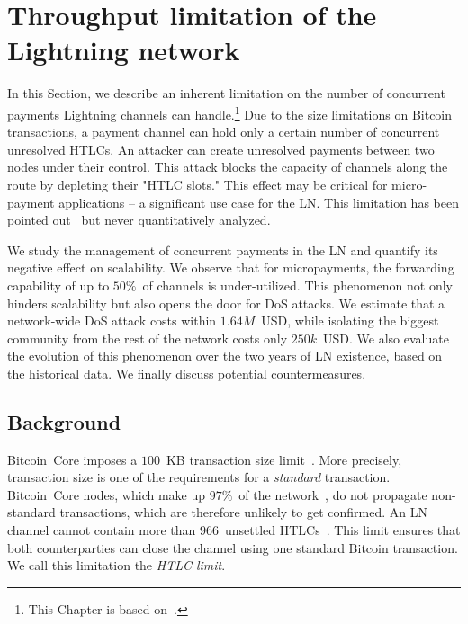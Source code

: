 \chapter{Throughput limitation of the Lightning network}

\label{Chapter08HTLClimit}

In this Section, we describe an inherent limitation on the number of concurrent payments Lightning channels can handle.\footnote{This Chapter is based on~\cite{Tikhomirov2020a}.}
Due to the size limitations on Bitcoin transactions, a payment channel can hold only a certain number of concurrent unresolved HTLCs.
An attacker can create unresolved payments between two nodes under their control.
This attack blocks the capacity of channels along the route by depleting their "HTLC slots."
This effect may be critical for micro-payment applications -- a significant use case for the LN\@.
This limitation has been pointed out~\cite{EmelyanenkoK2017} but never quantitatively analyzed.

We study the management of concurrent payments in the LN and quantify its negative effect on scalability.
We observe that for micropayments, the forwarding capability of up to $50\%$~of channels is under-utilized.
This phenomenon not only hinders scalability but also opens the door for DoS attacks.
We estimate that a network-wide DoS attack costs within $1.64M$~USD, while isolating the biggest community from the rest of the network costs only $250k$~USD\@.
We also evaluate the evolution of this phenomenon over the two years of LN existence, based on the historical data.
We finally discuss potential countermeasures.


\section{Background} \label{max-htlc-background}

Bitcoin~Core imposes a $100$~KB transaction size limit~\cite{StandardTxBitcoinSE, BitcoinCoreMaxTxWeight}.
More precisely, transaction size is one of the requirements for a \textit{standard} transaction.
Bitcoin~Core nodes, which make up $97\%$~of the network~\cite{CoinDance}, do not propagate non-standard transactions, which are therefore unlikely to get confirmed.
An LN channel cannot contain more than $966$~unsettled HTLCs~\cite{BOLT2Rationale}.
This limit ensures that both counterparties can close the channel using one standard Bitcoin transaction.
We call this limitation the \textit{HTLC limit}.

